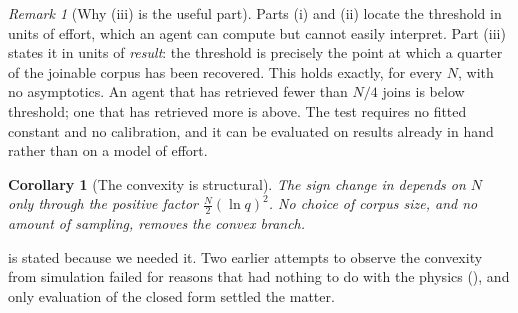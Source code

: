 \documentclass[11pt,twocolumn,a4paper]{article}
\theoremstyle{thmstyle}
\newtheorem{corollary}[theorem]{Corollary}
\theoremstyle{definition}
\theoremstyle{remark}
\newtheorem{remark}[theorem]{Remark}
\begin{document}
\begin{remark}[Why (iii) is the useful part]
\label{rem:quarter}
Parts (i) and (ii) locate the threshold in units of effort, which an
agent can compute but cannot easily interpret. Part (iii) states it in
units of \emph{result}: the threshold is precisely the point at which a
quarter of the joinable corpus has been recovered. This holds exactly,
for every $N$, with no asymptotics. An agent that has retrieved fewer
than $N/4$ joins is below threshold; one that has retrieved more is
above. The test requires no fitted constant and no calibration, and it
can be evaluated on results already in hand rather than on a model of
effort.
\end{remark}

\begin{corollary}[The convexity is structural]
\label{cor:structural}
The sign change in  depends on $N$ only through the
positive factor $\tfrac{N}{2}(\ln q)^{2}$. No choice of corpus size, and
no amount of sampling, removes the convex branch.
\end{corollary}

 is stated because we needed it. Two earlier
attempts to observe the convexity from simulation failed for reasons
that had nothing to do with the physics
(), and only evaluation of the closed form settled
the matter.
\end{document}
